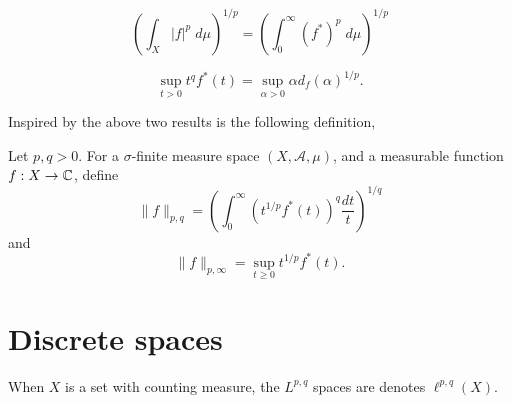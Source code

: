 \begin{lemma}
    \begin{equation*}
        \left(\int_X |f|^p\;d\mu\right)^{1/p} = \left(\int_0^\infty (f^*)^p\;d\mu\right)^{1/p}
    \end{equation*}
\end{lemma}
\begin{lemma}
    \begin{equation*}
        \sup_{t>0} t^qf^*(t) = \sup_{\alpha > 0} \alpha d_f(\alpha)^{1/p}.
    \end{equation*}
\end{lemma}

Inspired by the above two results is the following definition,
\begin{definition}
    Let $p,q > 0$. For a $\sigma$-finite measure space $(X,\mathcal{A},\mu)$, 
    and a measurable function $f:X\rightarrow \mathbb{C}$, define
    \begin{equation*}
        \|f\|_{p,q} = \left(\int_0^\infty (t^{1/p}f^*(t))^q\frac{dt}{t}\right)^{1/q}
    \end{equation*}
    and
    \begin{equation*}
        \|f\|_{p,\infty} = \sup_{t\geq 0} t^{1/p} f^*(t).
    \end{equation*}
\end{definition}

\section{Discrete spaces}
When $X$ is a set with counting measure, the $L^{p,q}$ spaces
are denotes $\ell^{p,q}(X)$. 

